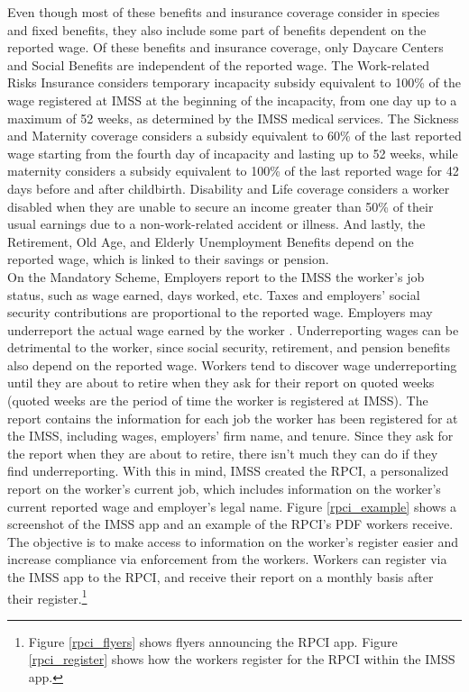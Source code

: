 \documentclass[10pt, oneside]{book}
\begin{document}
Even though most of these benefits and insurance coverage consider in species and fixed benefits, they also include some part of benefits dependent on the reported wage. Of these benefits and insurance coverage, only Daycare Centers and Social Benefits are independent of the reported wage. The Work-related Risks Insurance considers temporary incapacity subsidy equivalent to 100\% of the wage registered at IMSS at the beginning of the incapacity, from one day up to a maximum of 52 weeks, as determined by the IMSS medical services. The Sickness and Maternity coverage considers a subsidy equivalent to 60\% of the last reported wage starting from the fourth day of incapacity and lasting up to 52 weeks, while maternity considers a subsidy equivalent to 100\% of the last reported wage for 42 days before and after childbirth. Disability and Life coverage considers a worker disabled when they are unable to secure an income greater than 50\% of their usual earnings due to a non-work-related accident or illness. And lastly, the Retirement, Old Age, and Elderly Unemployment Benefits depend on the reported wage, which is linked to their savings or pension. \\

On the Mandatory Scheme, Employers report to the IMSS the worker's job status, such as wage earned, days worked, etc. Taxes and employers' social security contributions are proportional to the reported wage. Employers may underreport the actual wage earned by the worker \citep{kumler2020enlisting}. Underreporting wages can be detrimental to the worker, since social security, retirement, and pension benefits also depend on the reported wage. Workers tend to discover wage underreporting until they are about to retire when they ask for their report on quoted weeks (quoted weeks are the period of time the worker is registered at IMSS). The report contains the information for each job the worker has been registered for at the IMSS, including wages, employers' firm name, and tenure. Since they ask for the report when they are about to retire, there isn't much they can do if they find underreporting. With this in mind, IMSS created the RPCI, a personalized report on the worker's current job, which includes information on the worker's current reported wage and employer's legal name. Figure \ref{rpci_example} shows a screenshot of the IMSS app and an example of the RPCI's PDF workers receive. The objective is to make access to information on the worker's register easier and increase compliance via enforcement from the workers. Workers can register via the IMSS app to the RPCI, and receive their report on a monthly basis after their register.\footnote{Figure \ref{rpci_flyers} shows flyers announcing the RPCI app. Figure \ref{rpci_register} shows how the workers register for the RPCI within the IMSS app.} \\
\end{document}
